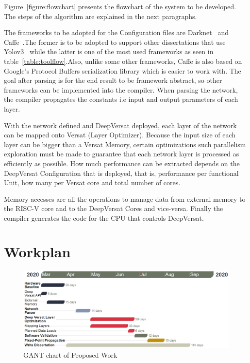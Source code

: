 Figure~\ref{figure:flowchart} presents the flowchart of the system to be developed. The steps
of the algorithm are explained in the next paragraphs.


The frameworks to be adopted for the Configuration files are Darknet~\cite{Darknet} and Caffe~\cite{caffe}.The former is to be adopted
to support other dissertations that use Yolov3~\cite{yolov3} while the latter is one of the most used frameworks as seen in table~\ref{table:toolflow}.Also,
unlike some other frameworks, Caffe is also based on Google's Protocol Buffers serialization library which is easier to work with.
The goal after parsing is for the end result to be framework abstract, so other frameworks can be implemented into the compiler.
When parsing the network, the compiler propagates the constants i.e input and output parameters of each layer.

With the network defined and DeepVersat deployed, each layer of the network can be mapped onto Versat (Layer Optimizer). Because the input size of each layer
can be bigger than a Versat Memory, certain optimizations such parallelism exploration must be made to guarantee that each network layer is processed as efficiently as possible. 
How much performance can be extracted depends on the DeepVersat Configuration that is deployed, that is, performance per functional Unit, how many per Versat core and
total number of cores.

Memory accesses are all the operations to manage data from external memory to the RISC-V core and to the DeepVersat Cores and vice-versa.
Finally the compiler generates the code for the CPU that controls DeepVersat.
\newpage
\section{Workplan}


\begin{figure}[!htb]
    \centering
    \includegraphics[width=1\textwidth]{Figures/gant22.png}
    \caption{GANT chart of Proposed Work}
    \label{figure:gant}
\end{figure}

